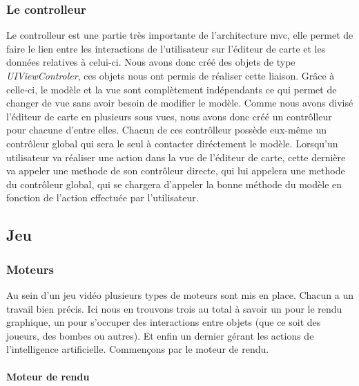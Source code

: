 			
	\subsubsection{Le controlleur}
		
		Le controlleur est une partie très importante de l'architecture \gls{mvc}, elle permet de faire le lien entre les interactions de l'utilisateur sur l'éditeur de carte et les données relatives à celui-ci. Nous avons  donc créé des objets de type \textit{UIViewControler}, ces objets nous ont permis de réaliser cette liaison. Grâce à celle-ci, le modèle et la vue sont complètement indépendants ce qui permet de changer de vue sans avoir besoin de modifier le modèle. Comme nous avons divisé l'éditeur de carte en plusieurs sous vues, nous avons donc créé un contrôlleur pour chacune d'entre elles. Chacun de ces contrôlleur possède eux-même un contrôleur global qui sera le seul à contacter diréctement le modèle. Lorsqu'un utilisateur va réaliser une action dans la vue de l'éditeur de carte, cette dernière va appeler une methode de son contrôleur directe, qui lui appelera une methode du contrôleur global, qui se chargera d'appeler la bonne méthode du modèle en fonction de l'action effectuée par l'utilisateur. 



\subsection{Jeu}

	\subsubsection{Moteurs}
	
		Au sein d'un jeu vidéo plusieurs types de moteurs sont mis en place.
		Chacun a un travail bien précis.
		Ici nous en trouvons trois au total à savoir un pour le rendu graphique, un
		pour s'occuper des interactions entre objets (que ce soit des joueurs, des bombes ou autres). Et enfin un dernier gérant
		les actions de l'intelligence artificielle.
		Commençons par le moteur de rendu.
	
		\paragraph{Moteur de rendu\\}
		
			\hypertarget{Moteur de rendu}{}
			\label{Moteur de rendu}
		
